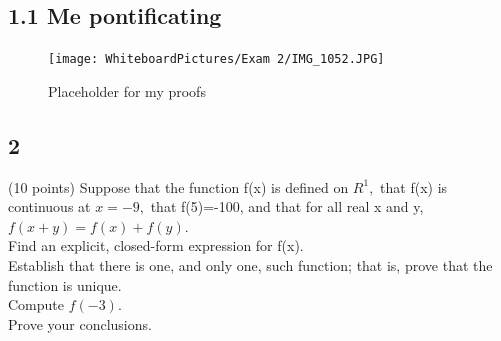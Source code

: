 \subsection*{1.1 Me pontificating}


\begin{figure}[h]\begin{center}\texttt{[image: WhiteboardPictures/Exam 2/IMG\_1052.JPG]}
\caption{Placeholder for my proofs} \label{fig:Euler_pic}\end{center}\end{figure} 

\newpage


\subsection*{2}
(10 points) Suppose that the function f(x) is defined on $R^1,$ that f(x) is continuous at $x=-9,$ that f(5)=-100, and that for all real x and y, $f(x+y)=f(x)+f(y).$ \\ 
Find an explicit, closed-form expression for f(x). \\ 
Establish that there is one, and only one, such function; that is, prove that the function is unique. \\ 
Compute $f(-3).$ \\ 
Prove your conclusions. \\ 



